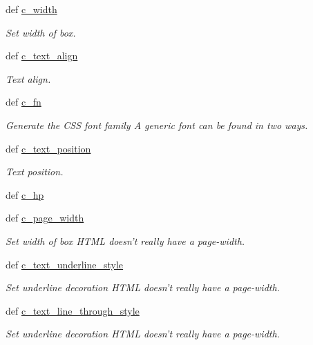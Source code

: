 \begin{DoxyCompactItemize}
def \hyperlink{classodf_1_1odf2xhtml_1_1StyleToCSS_a3b736d004a014f44f9b4b0a785f6c521}{c\+\_\+width}
\begin{DoxyCompactList}\small\item\em Set width of box. \end{DoxyCompactList}\item 
def \hyperlink{classodf_1_1odf2xhtml_1_1StyleToCSS_a0b2d3701c891d53a1a8a17bee7b03ac4}{c\+\_\+text\+\_\+align}
\begin{DoxyCompactList}\small\item\em Text align. \end{DoxyCompactList}\item 
def \hyperlink{classodf_1_1odf2xhtml_1_1StyleToCSS_a703a8b9ecab741226ba8ff32758e8b6d}{c\+\_\+fn}
\begin{DoxyCompactList}\small\item\em Generate the C\+S\+S font family A generic font can be found in two ways. \end{DoxyCompactList}\item 
def \hyperlink{classodf_1_1odf2xhtml_1_1StyleToCSS_aaa5fe16ebf02d9ad413bcf7f350d9f50}{c\+\_\+text\+\_\+position}
\begin{DoxyCompactList}\small\item\em Text position. \end{DoxyCompactList}\item 
def \hyperlink{classodf_1_1odf2xhtml_1_1StyleToCSS_a7ae83ac40aab56410adf7f13279de6b9}{c\+\_\+hp}
\item 
def \hyperlink{classodf_1_1odf2xhtml_1_1StyleToCSS_ac50cfa3fe23466b6610fc1d1ebcae5d2}{c\+\_\+page\+\_\+width}
\begin{DoxyCompactList}\small\item\em Set width of box H\+T\+M\+L doesn't really have a page-\/width. \end{DoxyCompactList}\item 
def \hyperlink{classodf_1_1odf2xhtml_1_1StyleToCSS_a59299bfcf552e28c13a9a0333d23ebdc}{c\+\_\+text\+\_\+underline\+\_\+style}
\begin{DoxyCompactList}\small\item\em Set underline decoration H\+T\+M\+L doesn't really have a page-\/width. \end{DoxyCompactList}\item 
def \hyperlink{classodf_1_1odf2xhtml_1_1StyleToCSS_aa3c6d04e9324bfedb7776d11f76e5142}{c\+\_\+text\+\_\+line\+\_\+through\+\_\+style}
\begin{DoxyCompactList}\small\item\em Set underline decoration H\+T\+M\+L doesn't really have a page-\/width. \end{DoxyCompactList}\item 

\end{DoxyCompactItemize}
